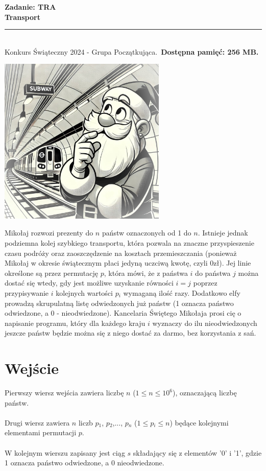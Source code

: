 \documentclass[a4paper,11pt]{article}
\newcommand{\tasktitle}{Transport}
\newcommand{\taskshort}{TRA}
\newcommand{\contestinfo}{Konkurs Świąteczny 2024 - Grupa Początkująca.}
\newcommand{\memorylimit}{256 MB}
\begin{document}
\noindent\textbf{\LARGE Zadanie: \taskshort} \\
\textbf{\Large \tasktitle} \\
\rule{\textwidth}{0.4pt} \\
\small \contestinfo \
\textbf{Dostępna pamięć: \memorylimit.}

\begin{center}
\includegraphics[width=0.6\textwidth]{transport_zdj_1.jpeg} %
\end{center}

\noindent Mikołaj rozwozi prezenty do $n$ państw oznaczonych od 1 do $n$. Istnieje jednak podziemna kolej szybkiego transportu, która pozwala na znaczne przyspieszenie czasu podróży oraz zaoszczędzenie na kosztach przemieszczania (ponieważ Mikołaj w okresie świątecznym płaci jedyną uczciwą kwotę, czyli 0zł). Jej linie określone są przez permutację $p$, która mówi, że z państwa $i$ do państwa $j$ można dostać się wtedy, gdy jest możliwe uzyskanie równości $i=j$ poprzez przypisywanie $i$ kolejnych wartości $p{_i}$ wymaganą ilość razy. Dodatkowo elfy prowadzą skrupulatną listę odwiedzonych już państw (1 oznacza państwo odwiedzone, a 0 - nieodwiedzone). Kancelaria Świętego Mikołaja prosi cię o napisanie programu, który dla każdego kraju $i$ wyznaczy do ilu nieodwiedzonych jeszcze państw będzie można się z niego dostać za darmo, bez korzystania z sań.

\section*{Wejście}
Pierwszy wiersz wejścia zawiera liczbę $n$ ($1 \leq n \leq 10^6$), oznaczającą liczbę państw.\\\\Drugi wiersz zawiera $n$ liczb $p{_1}$, $p{_2}$,..., $p{_n}$ ($1 \leq p{_i} \leq n$) będące kolejnymi elementami permutacji $p$.\\\\W kolejnym wierszu zapisany jest ciąg $s$ składający się z elementów '0' i '1', gdzie 1 oznacza państwo odwiedzone, a 0 nieodwiedzone.
\end{document}
